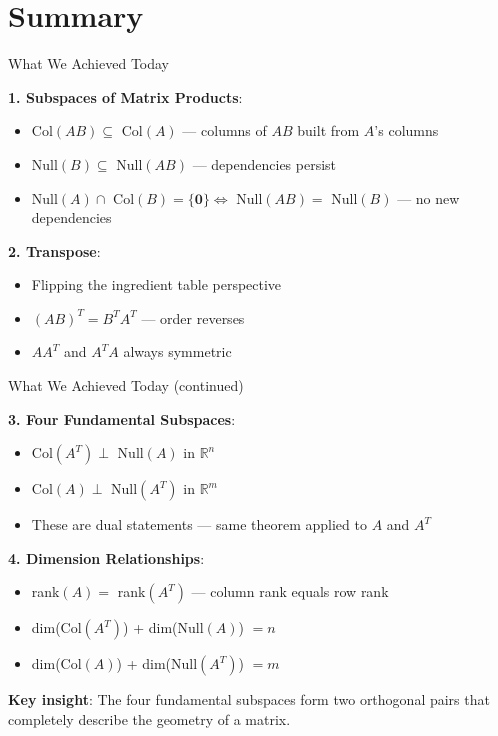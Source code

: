 \documentclass[10pt]{beamer}
\theoremstyle{definition}
\newcommand{\x}[1]{\alert{\textbf{#1}}}
\begin{document}
\section{Summary}

\begin{frame}{What We Achieved Today}

\x{1. Subspaces of Matrix Products}:
\begin{itemize}
\item Col$(AB) \subseteq$ Col$(A)$ — columns of $AB$ built from $A$'s columns
\item Null$(B) \subseteq$ Null$(AB)$ — dependencies persist
\item Null$(A) \cap$ Col$(B) = \{\mathbf{0}\} \Leftrightarrow$ Null$(AB) =$ Null$(B)$ — no new dependencies
\end{itemize}

\vspace{0.5em}

\x{2. Transpose}:
\begin{itemize}
\item Flipping the ingredient table perspective
\item $(AB)^T = B^T A^T$ — order reverses
\item $AA^T$ and $A^T A$ always symmetric
\end{itemize}

\end{frame}

\begin{frame}{What We Achieved Today (continued)}

\x{3. Four Fundamental Subspaces}:
\begin{itemize}
\item Col$(A^T) \perp$ Null$(A)$ in $\mathbb{R}^n$
\item Col$(A) \perp$ Null$(A^T)$ in $\mathbb{R}^m$
\item These are dual statements — same theorem applied to $A$ and $A^T$
\end{itemize}

\vspace{0.5em}

\x{4. Dimension Relationships}:
\begin{itemize}
\item rank$(A) =$ rank$(A^T)$ — column rank equals row rank
\item dim(Col$(A^T)$) + dim(Null$(A)$) $= n$
\item dim(Col$(A)$) + dim(Null$(A^T)$) $= m$
\end{itemize}

\vspace{1em}

\x{Key insight}: The four fundamental subspaces form two orthogonal pairs that completely describe the geometry of a matrix.

\end{frame}
\end{document}
